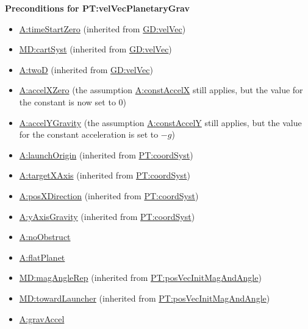 \documentclass[12pt]{article}
\begin{document}
\noindent \textbf{Preconditions for PT:velVecPlanetaryGrav}
\begin{itemize}
\item \hyperref[timeStartZero]{A:timeStartZero} (inherited from \hyperref[GD:velVec]{GD:velVec})
\item \hyperref[MD:cartSyst]{MD:cartSyst} (inherited from \hyperref[GD:velVec]{GD:velVec})
\item \hyperref[twoD]{A:twoD} (inherited from \hyperref[GD:velVec]{GD:velVec})
\item \hyperref[accelXZero]{A:accelXZero} (the assumption \hyperref[constAccelX]{A:constAccelX} still applies, but the value for the constant is now set to 0)
\item \hyperref[accelYGravity]{A:accelYGravity} (the assumption \hyperref[constAccelY]{A:constAccelY} still applies, but the value for the constant acceleration is set to $-g$)
\item \hyperref[launchOrigin]{A:launchOrigin} (inherited from \hyperref[PT:coordSyst]{PT:coordSyst})
\item \hyperref[targetXAxis]{A:targetXAxis} (inherited from \hyperref[PT:coordSyst]{PT:coordSyst})
\item \hyperref[posXDirection]{A:posXDirection} (inherited from \hyperref[PT:coordSyst]{PT:coordSyst})
\item \hyperref[yAxisGravity]{A:yAxisGravity} (inherited from \hyperref[PT:coordSyst]{PT:coordSyst})
\item \hyperref[noObstruct]{A:noObstruct}
\item \hyperref[flatPlanet]{A:flatPlanet}
\item \hyperref[MD:magAngleRep]{MD:magAngleRep} (inherited from \hyperref[PT:posVecInitMagAndAngle]{PT:posVecInitMagAndAngle})
\item \hyperref[MD:towardLauncher]{MD:towardLauncher} (inherited from \hyperref[PT:posVecInitMagAndAngle]{PT:posVecInitMagAndAngle})
\item \hyperref[gravAccel]{A:gravAccel}
\end{itemize}
\end{document}
